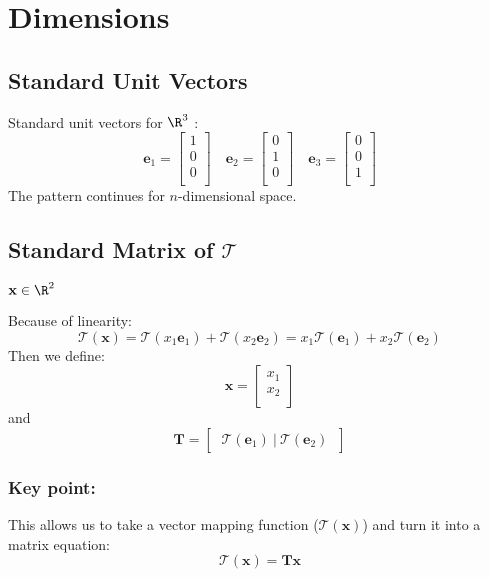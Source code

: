 \documentclass{article}
\author{Alex Hiller}
\title{}
\begin{document}
\section{Dimensions} 
\subsection{Standard Unit Vectors} 
Standard unit vectors for $ \R^{3} $ :
\[%
    \mathbf{e}_{1} 
    =
    \begin{bmatrix}
        1 \\ 0 \\ 0 \\
    \end{bmatrix}
    \quad
    \mathbf{e}_{2} 
    =
    \begin{bmatrix}
        0 \\ 1 \\ 0 \\
    \end{bmatrix}
    \quad
    \mathbf{e}_{3} 
    =
    \begin{bmatrix}
        0 \\ 0 \\ 1 \\
    \end{bmatrix}
\]%
The pattern continues for $ n $-dimensional space.

\subsection{Standard Matrix of $ \mathcal{T} $} 
$ \mathbf{x} \in \R^{2} $ 

Because of linearity:
\[%
    \mathcal{T}(\mathbf{x}) 
    =
    \mathcal{T}(x_1 \mathbf{e}_{1} )
    + 
    \mathcal{T}(x_2 \mathbf{e}_{2} )
    = 
    x_1 \mathcal{T}(\mathbf{e}_{1} ) + x_2 \mathcal{T}(\mathbf{e}_{2} )
\]%
Then we define:
\[%
    \mathbf{x} 
    =
    \begin{bmatrix}
        x_1 \\
		x_2 \\		
    \end{bmatrix}
\]%
and
\[%
    \mathbf{T}
    =
    \begin{bmatrix} \
        \mathcal{T}(\mathbf{e}_{1} ) \ | \
        \mathcal{T}(\mathbf{e}_{2} ) \
    \end{bmatrix}
\]%
\subsubsection{Key point:} 
This allows us to take a vector mapping function ($ \mathcal{T}(\mathbf{x}) $)
and turn it into a matrix equation:
\[%
    \mathcal{T}(\mathbf{x})
    =
    \mathbf{T} \mathbf{x}
\]%
\end{document}

